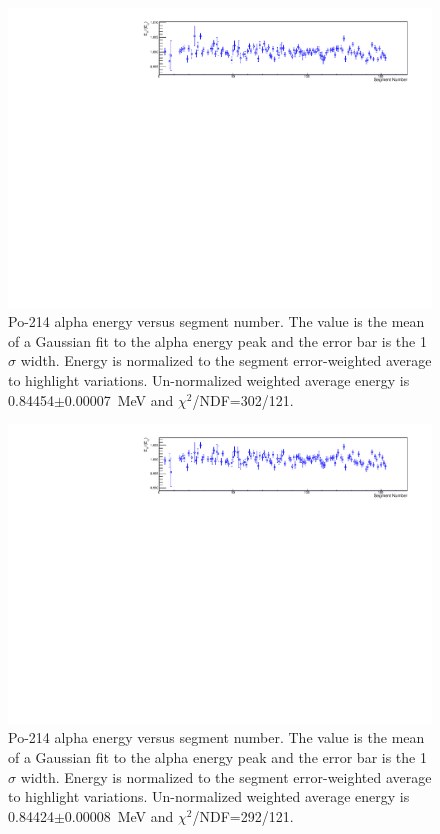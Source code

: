 \begin{figure}[!h]
\centering
\includegraphics[width=1.05\textwidth]{figures/PubBiPo214EvsCell.pdf}
\caption{\label{fig:EvsCell214}Po-214 alpha energy versus segment number. The value is the mean of a Gaussian fit to the alpha energy peak and the error bar is the 1$\sigma$ width. Energy is normalized to the segment error-weighted average to highlight variations. Un-normalized weighted average energy is 0.84454$\pm$0.00007~MeV and $\chi^2$/NDF=302/121.} 
\end{figure}
\begin{figure}[!h]
\centering
\includegraphics[width=1.05\textwidth]{figures/PubBiPo214EsmearvsCell.pdf}
\caption{\label{fig:EsmearvsCell214}Po-214 alpha energy versus segment number. The value is the mean of a Gaussian fit to the alpha energy peak and the error bar is the 1$\sigma$ width. Energy is normalized to the segment error-weighted average to highlight variations. Un-normalized weighted average energy is 0.84424$\pm$0.00008~MeV and $\chi^2$/NDF=292/121.} 
\end{figure}
\clearpage
\newpage

